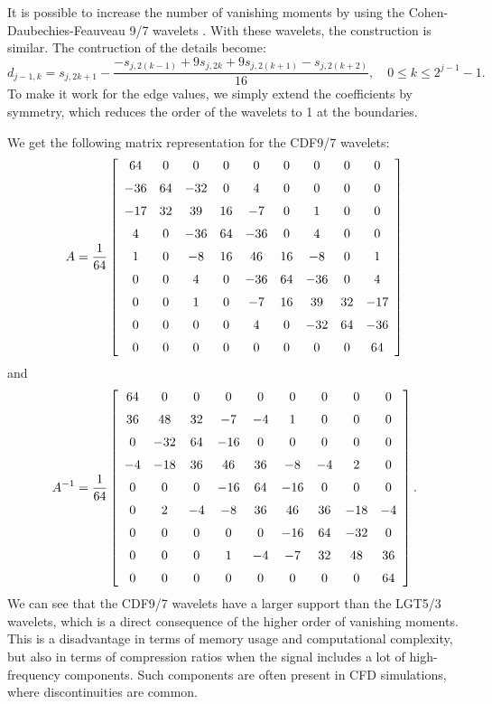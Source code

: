 It is possible to increase the number of vanishing moments by using the Cohen-Daubechies-Feauveau 9/7 wavelets \cite{cohen1992biorthogonal}.
With these wavelets, the construction is similar.
The contruction of the details become:
\begin{equation}
\label{eq:compute_details_9_7}
d_{j-1,k}=s_{j,2k+1}-\frac{-s_{j,2(k-1)}+9s_{j,2k}+9s_{j,2(k+1)}-s_{j,2(k+2)}}{16},\quad0\leq k\leq2^{j-1}-1.
\end{equation}
To make it work for the edge values, we simply extend the coefficients by symmetry, which reduces the order of the wavelets to 1 at the boundaries.

We get the following matrix representation for the CDF9/7 wavelets:
\begin{equation}
A=\frac{1}{64}\left[\begin{array}{ccccccccc}
64 & 0 & 0 & 0 & 0 & 0 & 0 & 0 & 0\\
\noalign{\medskip}-36 & 64 & -32 & 0 & 4 & 0 & 0 & 0 & 0\\
\noalign{\medskip}-17 & 32 & 39 & 16 & -7 & 0 & 1 & 0 & 0\\
\noalign{\medskip}4 & 0 & -36 & 64 & -36 & 0 & 4 & 0 & 0\\
\noalign{\medskip}1 & 0 & -8 & 16 & 46 & 16 & -8 & 0 & 1\\
\noalign{\medskip}0 & 0 & 4 & 0 & -36 & 64 & -36 & 0 & 4\\
\noalign{\medskip}0 & 0 & 1 & 0 & -7 & 16 & 39 & 32 & -17\\
\noalign{\medskip}0 & 0 & 0 & 0 & 4 & 0 & -32 & 64 & -36\\
\noalign{\medskip}0 & 0 & 0 & 0 & 0 & 0 & 0 & 0 & 64
\end{array}\right]
\end{equation}
and
\begin{equation}
A^{-1}=\frac{1}{64}\left[\begin{array}{ccccccccc}
64 & 0 & 0 & 0 & 0 & 0 & 0 & 0 & 0\\
\noalign{\medskip}36 & 48 & 32 & -7 & -4 & 1 & 0 & 0 & 0\\
\noalign{\medskip}0 & -32 & 64 & -16 & 0 & 0 & 0 & 0 & 0\\
\noalign{\medskip}-4 & -18 & 36 & 46 & 36 & -8 & -4 & 2 & 0\\
\noalign{\medskip}0 & 0 & 0 & -16 & 64 & -16 & 0 & 0 & 0\\
\noalign{\medskip}0 & 2 & -4 & -8 & 36 & 46 & 36 & -18 & -4\\
\noalign{\medskip}0 & 0 & 0 & 0 & 0 & -16 & 64 & -32 & 0\\
\noalign{\medskip}0 & 0 & 0 & 1 & -4 & -7 & 32 & 48 & 36\\
\noalign{\medskip}0 & 0 & 0 & 0 & 0 & 0 & 0 & 0 & 64
\end{array}\right].
\end{equation}
We can see that the CDF9/7 wavelets have a larger support than the LGT5/3 wavelets, which is a direct consequence of the higher order of vanishing moments.
This is a disadvantage in terms of memory usage and computational complexity, but also in terms of compression ratios when the signal includes a lot of high-frequency components.
Such components are often present in CFD simulations, where discontinuities are common.

